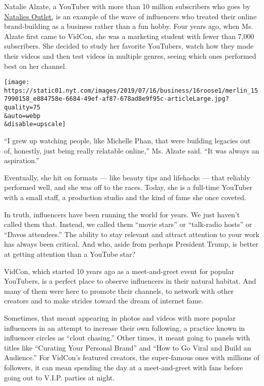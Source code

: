 Natalie Alzate, a YouTuber with more than 10 million subscribers who
goes by \href{https://www.youtube.com/user/nataliesoutlet}{Natalies
Outlet,} is an example of the wave of influencers who treated their
online brand-building as a business rather than a fun hobby. Four years
ago, when Ms. Alzate first came to VidCon, she was a marketing student
with fewer than 7,000 subscribers. She decided to study her favorite
YouTubers, watch how they made their videos and then test videos in
multiple genres, seeing which ones performed best on her channel.

\texttt{[image: https://static01.nyt.com/images/2019/07/16/business/16roose1/merlin\_157990158\_e884758e-6684-49ef-af87-678ad8e9f95c-articleLarge.jpg?quality=75\\\&auto=webp\\\&disable=upscale]}

``I grew up watching people, like Michelle Phan, that were building
legacies out of, honestly, just being really relatable online,'' Ms.
Alzate said. ``It was always an aspiration.''

Eventually, she hit on formats --- like beauty tips and lifehacks ---
that reliably performed well, and she was off to the races. Today, she
is a full-time YouTuber with a small staff, a production studio and the
kind of fame she once coveted.

In truth, influencers have been running the world for years. We just
haven't called them that. Instead, we called them ``movie stars'' or
``talk-radio hosts'' or ``Davos attendees.'' The ability to stay
relevant and attract attention to your work has always been critical.
And who, aside from perhaps President Trump, is better at getting
attention than a YouTube star?

VidCon, which started 10 years ago as a meet-and-greet event for popular
YouTubers, is a perfect place to observe influencers in their natural
habitat. And many of them were here to promote their channels, to
network with other creators and to make strides toward the dream of
internet fame.

Sometimes, that meant appearing in photos and videos with more popular
influencers in an attempt to increase their own following, a practice
known in influencer circles as ``clout chasing.'' Other times, it meant
going to panels with titles like ``Curating Your Personal Brand'' and
``How to Go Viral and Build an Audience.'' For VidCon's featured
creators, the super-famous ones with millions of followers, it can mean
spending the day at a meet-and-greet with fans before going out to
V.I.P. parties at night.

